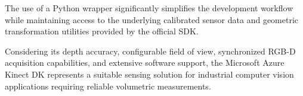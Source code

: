 The use of a Python wrapper significantly simplifies the development workflow while maintaining access to the underlying calibrated sensor data and geometric transformation utilities provided by the official SDK.

Considering its depth accuracy, configurable field of view, synchronized RGB-D acquisition capabilities, and extensive software support, the Microsoft Azure Kinect DK represents a suitable sensing solution for industrial computer vision applications requiring reliable volumetric measurements.
